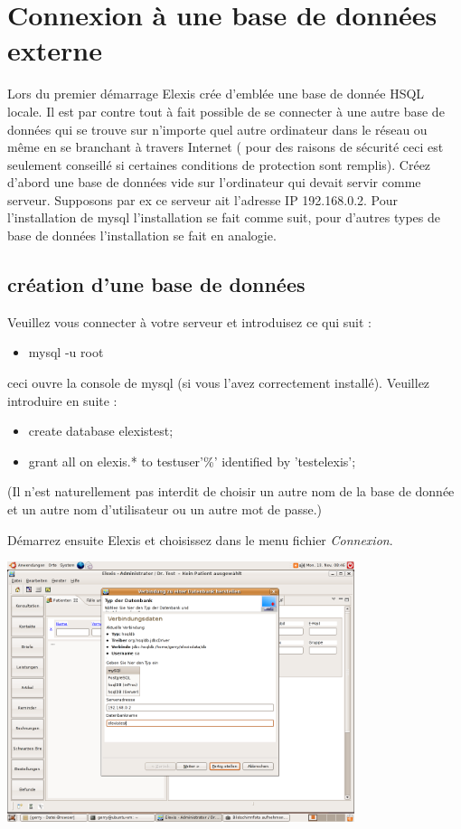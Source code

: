\section{Connexion à une base de données externe}
 Lors du premier démarrage Elexis crée d'emblée une base de donnée HSQL locale. Il est par contre tout à fait possible de se connecter à une autre base de données qui se trouve sur n'importe quel autre ordinateur dans le réseau ou même en se branchant à travers Internet ( pour des raisons de sécurité ceci est seulement conseillé si certaines conditions de protection sont remplis). Créez d'abord une base de données vide sur l'ordinateur qui devait servir comme serveur. Supposons par ex ce serveur ait l'adresse IP 192.168.0.2. Pour l'installation de mysql l'installation se fait comme suit, pour d'autres types de base de données l'installation se fait en analogie.

\subsection{création d'une base de données}
Veuillez vous connecter à votre serveur et introduisez ce qui suit :
\begin{itemize}
 \item mysql -u root
\end{itemize}

ceci ouvre la console de mysql (si vous l'avez correctement installé).
Veuillez introduire en suite : 
\begin{itemize}
 \item create database elexistest;
\item grant all on elexis.* to testuser\@'\%' identified by 'testelexis';
\end{itemize}




(Il  n'est naturellement pas interdit de choisir un autre nom de la base de donnée et un autre nom d'utilisateur ou un autre mot de passe.)

Démarrez ensuite Elexis et choisissez dans le menu fichier  \textit{Connexion}.

\includegraphics[width=4in]{images/verbindung1.png}

